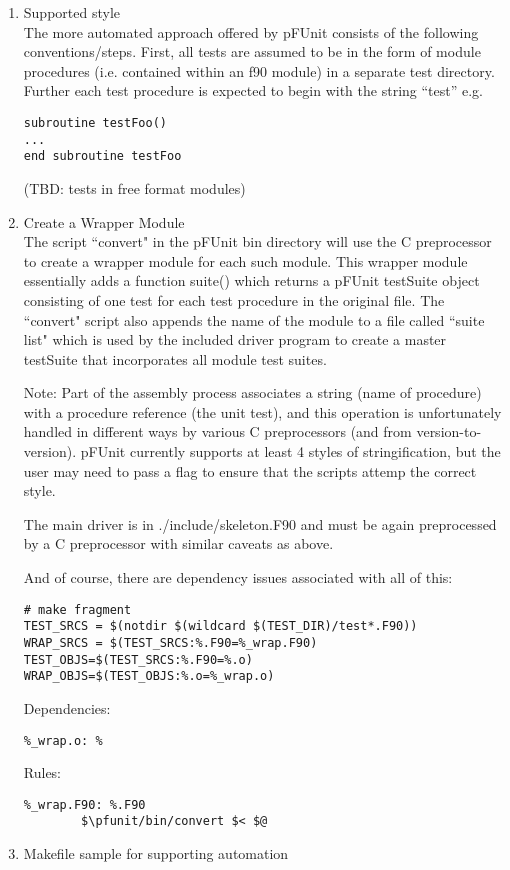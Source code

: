 \documentclass[10pt]{article}
\newcommand{\pfunit}{{\sc pFUnit }}
\begin{document}
\begin{enumerate}
\item Supported style\\
The more automated approach offered by \pfunit consists of the
following conventions/steps.  First, all tests are assumed to be in
the form of module procedures (i.e. contained within an f90 module) in
a separate test directory.  Further each test procedure is expected to
begin with the string ``test'' e.g.

\begin{verbatim}
subroutine testFoo()
...
end subroutine testFoo
\end{verbatim}

(TBD:  tests in free format modules)

\item Create a Wrapper Module\\
The script ``convert" in the \pfunit bin directory will use the C
preprocessor to create a wrapper module for each such module.  This
wrapper module essentially adds a function suite() which returns a
\pfunit testSuite object consisting of one test for each test
procedure in the original file.  The ``convert" script also appends
the name of the module to a file called ``suite\underline{ }list" which is used
by the included driver program to create a master testSuite that
incorporates all module test suites.

Note: Part of the assembly process associates a string (name of
procedure) with a procedure reference (the unit test), and this
operation is unfortunately handled in different ways by various C
preprocessors (and from version-to-version).  \pfunit currently
supports at least 4 styles of stringification, but the user may need
to pass a flag to ensure that the scripts attemp the correct style.

The main driver is in ./include/skeleton.F90 and must be again
preprocessed by a C preprocessor with similar caveats as above.

And of course, there are dependency issues associated with all of this:

\begin{verbatim}
# make fragment
TEST_SRCS = $(notdir $(wildcard $(TEST_DIR)/test*.F90))
WRAP_SRCS = $(TEST_SRCS:%.F90=%_wrap.F90)
TEST_OBJS=$(TEST_SRCS:%.F90=%.o)
WRAP_OBJS=$(TEST_OBJS:%.o=%_wrap.o)
\end{verbatim}

Dependencies:
\begin{verbatim}
%_wrap.o: %
\end{verbatim}

Rules:
\begin{verbatim}
%_wrap.F90: %.F90
        $\pfunit/bin/convert $< $@
\end{verbatim}

\item Makefile sample for supporting automation

\end{enumerate}
\end{document}
